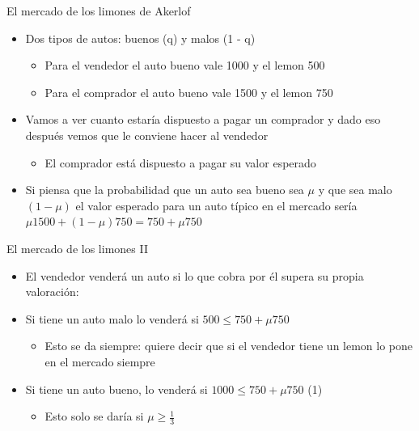 \documentclass{beamer}
\begin{document}
\begin{frame}{El mercado de los limones de Akerlof}
\begin{itemize}
    \item Dos tipos de autos: buenos (q) y malos (1 - q)
    \begin{itemize}
    \item Para el vendedor el auto bueno vale 1000 y el lemon 500 
    \item Para el comprador el auto bueno vale 1500 y el lemon 750 
    \end{itemize} \vspace{3mm}
    \item Vamos a ver cuanto estaría dispuesto a pagar un comprador y dado eso después vemos que le conviene hacer al vendedor
    \begin{itemize}
    \item El comprador está dispuesto a pagar su valor esperado
    \end{itemize} \vspace{3mm}
    \item Si piensa que la probabilidad que un auto sea bueno sea  $\mu$ y que sea malo  $(1-\mu)$ el valor esperado para un auto típico en el mercado sería  $\mu 1500 + (1-\mu) 750= 750 + \mu 750$ 
\end{itemize}
\end{frame}

\begin{frame}{El mercado de los limones II}
\begin{itemize}
    \item El vendedor venderá un auto si lo que cobra por él supera su propia valoración:
    \vspace{3mm}
    \item Si tiene un auto malo lo venderá si 
    $500 \leq 750 + \mu 750$
    \begin{itemize}
    \item Esto se da siempre: quiere decir que si el vendedor tiene un lemon lo pone en el mercado siempre
    \end{itemize} \vspace{3mm}
    \item Si tiene un auto bueno, lo venderá si 
    $1000 \leq 750 + \mu 750 $ (1)
    \begin{itemize}
    \item Esto solo se daría si $\mu \geq \frac{1}{3}$
    \end{itemize} \vspace{3mm}
\end{itemize}
\end{frame}
\end{document}
